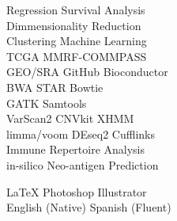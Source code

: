 \begin{minipage}[t]{0.33\textwidth}
Regression \textbullet{} Survival Analysis \\
Dimmensionality Reduction \\
Clustering \textbullet{} Machine Learning \\

TCGA \textbullet{} MMRF-COMMPASS \\
GEO/SRA \textbullet{} GitHub \textbullet{} Bioconductor \\

BWA \textbullet{} STAR \textbullet{} Bowtie \\

GATK \textbullet{} Samtools \\
VarScan2 \textbullet{} CNVkit \textbullet{} XHMM \\

limma/voom \textbullet{} DEseq2 \textbullet{} Cufflinks \\

Immune Repertoire Analysis \textbullet{} \\
in-silico Neo-antigen Prediction \\
\sectionspace %

\LaTeX \textbullet{} Photoshop \textbullet{} Illustrator \\
English (Native) \textbullet{} Spanish (Fluent)

\sectionspace %

\end{minipage} %
\hfill
%
%
